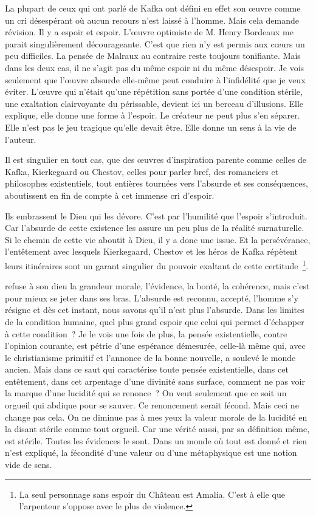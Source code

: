 \documentclass{book}
\begin{document}
La plupart de ceux qui ont parlé de Kafka ont défini en effet son œuvre comme un cri désespérant où aucun recours n'est laissé à l'homme. Mais cela demande révision. Il y a espoir et espoir. L'œuvre optimiste de M. Henry Bordeaux me parait singulièrement décourageante. C'est que rien n'y est permis aux cœurs un peu difficiles. La pensée de Malraux au contraire reste toujours tonifiante. Mais dans les deux cas, il ne s'agit pas du même espoir ni du même désespoir. Je vois seulement que l'œuvre absurde elle‑même peut conduire à l'infidélité que je veux éviter. L'œuvre qui n'était qu'une répétition sans portée d'une condition stérile, une exaltation clairvoyante du périssable, devient ici un berceau d'illusions. Elle explique, elle donne une forme à l'espoir. Le créateur ne peut plus s'en séparer. Elle n'est pas le jeu tragique qu'elle devait être. Elle donne un sens à la vie de l'auteur.

Il est singulier en tout cas, que des œuvres d'inspiration parente comme celles de Kafka, Kierkegaard ou Chestov, celles pour parler bref, des romanciers et philosophes existentiels, tout entières tournées vers l'absurde et ses conséquences, aboutissent en fin de compte à cet immense cri d'espoir.

Ils embrassent le Dieu qui les dévore. C'est par l'humilité que l'espoir s'introduit. Car l'absurde de cette existence les assure un peu plus de la réalité surnaturelle. Si le chemin de cette vie aboutit à Dieu, il y a donc une issue. Et la persévérance, l'entêtement avec lesquels Kierkegaard, Chestov et les héros de Kafka répètent leurs itinéraires sont un garant singulier du pouvoir exaltant de cette certitude \footnote{La seul personnage sans espoir du Château est Amalia. C'est à elle que l'arpenteur s'oppose avec le plus de violence.}.

refuse à son dieu la grandeur morale, l'évidence, la bonté, la cohérence, mais c'est pour mieux se jeter dans ses bras. L'absurde est reconnu, accepté, l'homme s'y résigne et dès cet instant, nous savons qu'il n'est plus l'absurde. Dans les limites de la condition humaine, quel plus grand espoir que celui qui permet d'échapper à cette condition ? Je le vois une fois de plus, la pensée existentielle, contre l'opinion courante, est pétrie d'une espérance démesurée, celle‑là même qui, avec le christianisme primitif et l'annonce de la bonne nouvelle, a soulevé le monde ancien. Mais dans ce saut qui caractérise toute pensée existentielle, dans cet entêtement, dans cet arpentage d'une divinité sans surface, comment ne pas voir la marque d'une lucidité qui se renonce ? On veut seulement que ce soit un orgueil qui abdique pour se sauver. Ce renoncement serait fécond. Mais ceci ne change pas cela. On ne diminue pas à mes yeux la valeur morale de la lucidité en la disant stérile comme tout orgueil. Car une vérité aussi, par sa définition même, est stérile. Toutes les évidences le sont. Dans un monde où tout est donné et rien n'est expliqué, la fécondité d'une valeur ou d'une métaphysique est une notion vide de sens.
\end{document}
